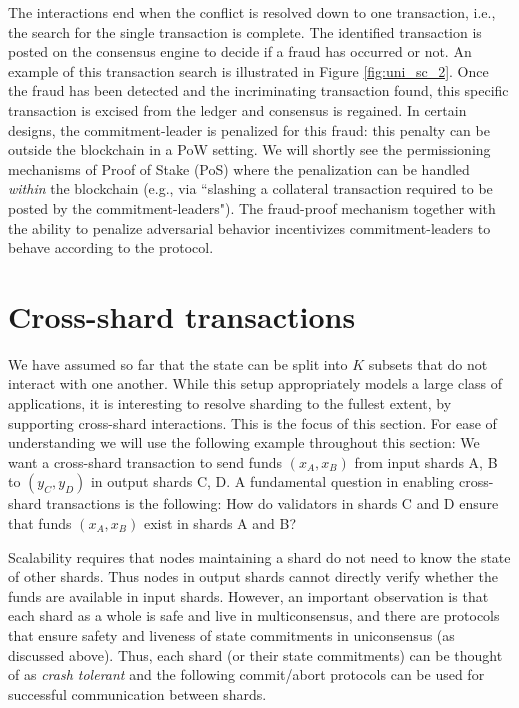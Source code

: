 \documentclass{article}
\begin{document}
The interactions end when the conflict is resolved down to one transaction, i.e., the search for the single transaction is complete. The identified transaction is posted on the consensus engine to decide if a fraud has occurred or not. An example of this transaction search is illustrated in Figure \ref{fig:uni_sc_2}. Once the fraud has been detected and the incriminating transaction found, this specific transaction is excised from the ledger and consensus is regained. In certain designs, the commitment-leader is penalized for this fraud: this penalty can be outside the blockchain in a PoW setting. We will shortly see the permissioning mechanisms of Proof of Stake (PoS) where the penalization can be handled {\em within} the blockchain (e.g., via ``slashing a collateral transaction required to be posted by the commitment-leaders"). The  fraud-proof mechanism together with the ability to penalize adversarial behavior incentivizes commitment-leaders to behave  according to the protocol. 

\section{Cross-shard transactions}

We have assumed so far that the state can be split into $K$ subsets that do not interact with one another. While this setup appropriately models a large class of applications, it is interesting to resolve sharding to the fullest extent, by supporting cross-shard interactions. This is the focus of this section. For ease of understanding we will use the following example throughout  this section: We want a cross-shard transaction to send funds $(x_A,x_B)$ from input shards A, B to $(y_C,y_D)$ in output shards C, D. A fundamental question in enabling cross-shard transactions is the following: How do validators in shards C and D ensure that funds $(x_A,x_B)$ exist in shards A and B?

Scalability requires that nodes maintaining a shard do not need to know the state of  other shards. Thus nodes in output shards cannot directly verify whether the funds are available in input shards. However, an important observation is that each shard as a whole is safe and live in multiconsensus, and there are protocols that ensure safety and liveness of  state commitments in uniconsensus (as discussed above). Thus, each shard (or their state commitments) can be thought of as {\em crash tolerant} and the following  commit/abort protocols can be used for successful  communication between shards. 
\end{document}
